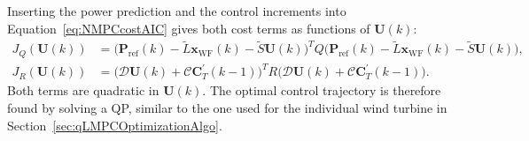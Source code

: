 Inserting the power prediction and the control increments into Equation~\eqref{eq:NMPCcostAIC} gives both cost terms as functions of $\bm{U}(k)$:
\begin{equation} \label{eq:cost_termsAIC}
    \begin{aligned}
        J_Q(\bm{U}(k)) &= \big(\bm{P}_{\text{ref}}(k) - \tilde{L} \bm{x}_{\text{WF}}(k) - \tilde{S} \bm{U}(k)\big)^T Q \big(\bm{P}_{\text{ref}}(k) - \tilde{L} \bm{x}_{\text{WF}}(k) - \tilde{S} \bm{U}(k)\big), \\[1ex]
        J_R(\bm{U}(k)) &= \big(\bm{\mathcal{D}} \bm{U}(k) + \bm{\mathcal{C}} \bm{C}_T^\prime(k-1)\big)^T R \big(\bm{\mathcal{D}} \bm{U}(k) + \bm{\mathcal{C}} \bm{C}_T^\prime(k-1)\big).
    \end{aligned}
\end{equation}
Both terms are quadratic in $\bm{U}(k)$. The optimal control trajectory is therefore found by solving a QP, similar to the one used for the individual wind turbine in Section~\ref{sec:qLMPCOptimizationAlgo}.

